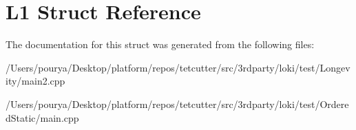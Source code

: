 \hypertarget{structL1}{}\section{L1 Struct Reference}
\label{structL1}


The documentation for this struct was generated from the following files\+:\begin{DoxyCompactItemize}
\item 
/\+Users/pourya/\+Desktop/platform/repos/tetcutter/src/3rdparty/loki/test/\+Longevity/main2.\+cpp\item 
/\+Users/pourya/\+Desktop/platform/repos/tetcutter/src/3rdparty/loki/test/\+Ordered\+Static/main.\+cpp\end{DoxyCompactItemize}
